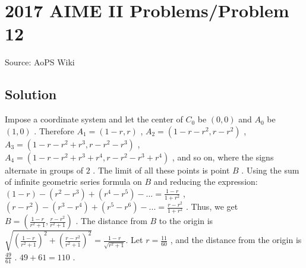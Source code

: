\documentclass[12pt]{article}
\begin{document}
\section*{{2017 AIME II Problems/Problem 12}}
Source: AoPS Wiki

\subsection*{Solution}
Impose a coordinate system and let the center of $C_0$ be $(0,0)$ and $A_0$ be $(1,0)$ . Therefore $A_1=(1-r,r)$ , $A_2=(1-r-r^2,r-r^2)$ , $A_3=(1-r-r^2+r^3,r-r^2-r^3)$ , $A_4=(1-r-r^2+r^3+r^4,r-r^2-r^3+r^4)$ , and so on, where the signs alternate in groups of $2$ . The limit of all these points is point $B$ . Using the sum of infinite geometric series formula on $B$ and reducing the expression: $(1-r)-(r^2-r^3)+(r^4-r^5)-...=\frac{1-r}{1+r^2}$ , $(r-r^2)-(r^3-r^4)+(r^5-r^6)-...=\frac{r-r^2}{1+r^2}$ . Thus, we get $B=\left(\frac{1-r}{r^2+1},\frac{r-r^2}{r^2+1}\right)$ . The distance from $B$ to the origin is $\sqrt{\left(\frac{1-r}{r^2+1}\right)^2+\left(\frac{r-r^2}{r^2+1}\right)^2}=\frac{1-r}{\sqrt{r^2+1}}.$ Let $r=\frac{11}{60}$ , and the distance from the origin is $\frac{49}{61}$ . $49+61=\boxed{110}$ .
\end{document}
